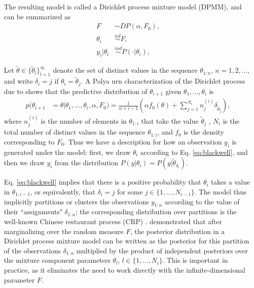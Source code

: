 \documentclass{uwstat572}
\begin{document}
The resulting model is called a Dirichlet process mixture model (DPMM), and can be summarized as
\begin{align} 
F &\sim DP(\alpha,F_0), \nonumber \\
\theta_i &\overset{iid}{\sim} F, \nonumber \\
y_i | \theta_i &\overset{ind}{\sim} P(\cdot | {\theta_i}), \nonumber
\end{align}

Let  $\tilde{\theta} \in \{\tilde{\theta}_l\}_{l=1}^\infty$ denote the set of distinct values in the sequence $\theta_{1:n}$, $n = 1,2,...$, and write $\delta_i = j$ if $\theta_i = \tilde{\theta}_j$. A Polya urn characterization of the Dirichlet process due to \cite{blackwell} shows that the predictive distribution of ${\theta}_{i+1}$ given ${\theta}_{1},...,{\theta}_{i}$ is
\begin{align} p({\theta}_{i+1} &= \theta| {\theta}_{1},...,{\theta}_{i},\alpha,F_0)= \frac{1}{\alpha+i-1}\left(\alpha f_0(\theta) + \sum_{j=1}^{N_i} n^{(i)}_j\delta_{\tilde{\theta}_j} \right), \label{eq:blackwell} \end{align}
where $n^{(i)}_j$ is the number of elements in $\theta_{1:i}$ that take the value $\tilde{\theta}_j$ , $N_i$ is the total number of distinct values in the sequence $\theta_{1:i}$, and $f_0$ is the density corresponding to $F_0$. Thus we have a description for how an observation $y_i$ is generated under the model: first, we draw ${\theta}_i$ according to Eq. \ref{eq:blackwell}, and then we draw $y_i$ from the distribution $P(y | {\theta}_i) = P(y | \tilde{\theta}_{\delta_i})$. 

Eq. \ref{eq:blackwell} implies that there is a positive probability that $\theta_i$ takes a value in $\theta_{1:i-1}$, or equivalently, that $\delta_i = j$ for some $j \in \{1,...,N_{i-1}\}$. The model thus implicitly partitions or clusters the observations $y_{1:n}$ according to the value of their ``assignments" $\delta_{1:n}$; the corresponding distribution over partitions is the well-known Chinese restaurant process (CRP) \citep{pitman}. \cite{lo} demonstrated that after marginalizing over the random measure $F$, the posterior distribution in a Dirichlet process mixture model can be written as the posterior for this partition of the observations $\delta_{1:n}$ multiplied by the product of independent posteriors over the mixture component parameters $\theta_l$, $l \in \{1,...,N_i\}$. This is important in practice, as it eliminates the need to work directly with the infinite-dimensional parameter $F$.
\end{document}
